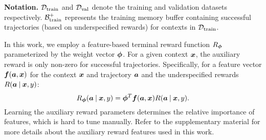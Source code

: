 {\bf Notation.} $\mathcal{D}_{\mathrm{train}}$ and $\mathcal{D}_{\mathrm{val}}$ denote the training and validation datasets
respectively. $\mathcal{B}^{+}_{\mathrm{train}}$ represents the training memory buffer containing successful trajectories (based on underspecified rewards)
for contexts in $\mathcal{D}_{\mathrm{train}}$.

In this work, we employ a feature-based terminal reward function $R_{{\bm{\phi}}}$
parameterized by the weight vector ${\bm{\phi}}$. For a given context ${\bm{x}}$,
the auxiliary reward is only non-zero for successful trajectories.
Specifically, for a feature vector ${\bm{f}}({\bm{a}}, {\bm{x}})$ for the context ${\bm{x}}$ and trajectory
${\bm{a}}$ and the underspecified rewards $R({\bm{a}} \:\vert\: {\bm{x}}, y)$:
\begin{equation}
R_{{\bm{\phi}}}({\bm{a}} \:\vert\: {\bm{x}}, y) = {\bm{\phi}}^{T} {\bm{f}}({\bm{a}}, {\bm{x}}) R({\bm{a}} \:\vert\: {\bm{x}}, y)
.
\label{eqn:auxiliary_reward}
\end{equation}
Learning the auxiliary reward parameters determines the relative importance of 
features, which is hard to tune manually. Refer to the supplementary material for 
more details about the auxiliary reward features used in this work. 

